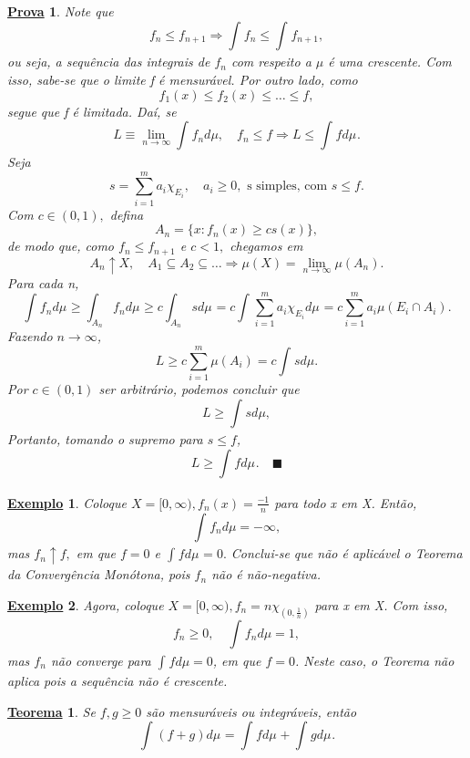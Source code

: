 \documentclass{article}
\newtheorem*{theorem*}{\underline{Teorema}}
\newtheorem{example}{\underline{Exemplo}}
\newtheorem*{proof*}{\underline{Prova}}
\renewcommand\qedsymbol{$\blacksquare$}
\begin{document}
  \begin{proof*}
   Note que 
     \[
       f_{n}\leq f_{n+1} \Rightarrow \int_{}^{}f_{n}\leq \int_{}^{}f_{n+1},
     \]
  ou seja, a sequência das integrais de \(f_{n}\) com respeito a \(\mu \) é uma crescente. Com isso, sabe-se que o limite f é mensurável. Por outro lado, como 
    \[
      f_1(x)\leq f_2(x)\leq \dotsc \leq f,
    \]
    segue que f é limitada. Daí, se 
      \[
        L\equiv \lim_{n\to \infty}\int_{}^{}f_{n}d\mu ,\quad f_{n}\leq f \Rightarrow L \leq \int_{}f d\mu_{}.
      \]
    Seja 
      \[
        s = \sum\limits_{i=1}^{m}a_{i}\chi_{E_{i}},\quad a_{i}\geq 0, \text{ s simples, com } s\leq f.
      \]
    Com \(c\in (0, 1),\) defina 
      \[
        A_{n} = \{x: f_{n}(x) \geq cs(x)\},
      \]
    de modo que, como \(f_{n}\leq f_{n+1}\) e \(c < 1,\) chegamos em 
      \[
        A_{n}\uparrow X,\quad A_1\subseteq A_2\subseteq \dotsc \Rightarrow \mu (X) = \lim_{n\to \infty}\mu (A_{n}).
      \]
    Para cada n, 
      \[
        \int_{}f_{n} d\mu_{} \geq \int_{A_{n}}f_{n} d\mu_{} \geq c \int_{A_{n}}s d\mu_{} = c \int_{}\sum\limits_{i=1}^{m}a_{i}\chi_{E_{i}} d\mu_{} = c \sum\limits_{i=1}^{m}a_{i}\mu (E_{i}\cap A_{i}).
      \]
    Fazendo \(n\to \infty\), 
      \[
        L \geq c \sum\limits_{i=1}^{m}\mu (A_{i}) = c \int_{}^{}s d\mu .
      \]
    Por \(c\in (0, 1)\) ser arbitrário, podemos concluir que 
      \[
        L \geq \int_{}^{}s d\mu, 
      \]
    Portanto, tomando o supremo para \(s \leq f\), 
      \[
        L \geq \int_{}f d\mu_{}.\quad \text{\qedsymbol}
      \]
 \end{proof*}
 \begin{example}
   Coloque \(X = [0, \infty), f_{n}(x) = \frac{-1}{n}\) para todo x em X. Então, 
     \[
       \int_{}^{}f_{n}d\mu = -\infty,
     \]
    mas \(f_{n}\uparrow f,\) em que \(f=0\) e \(\int_{}f d\mu_{} = 0.\) Conclui-se que não é aplicável o Teorema da Convergência Monótona, pois \(f_{n}\) não é não-negativa.
 \end{example}
 \begin{example}
   Agora, coloque \(X = [0, \infty), f_{n} = n \chi_{(0, \frac{1}{n})}\) para x em X. Com isso, 
     \[
       f_{n}\geq 0,\quad \int_{}^{}f_{n}d\mu = 1,
     \]
    mas \(f_{n}\) não converge para \(\int_{}^{}f d\mu = 0\), em que \(f=0\). Neste caso, o Teorema não aplica pois a sequência não é crescente.
 \end{example}
\begin{theorem*}
  Se \(f, g \geq 0\) são mensuráveis ou integráveis, então 
    \[
      \int_{}(f+g) d\mu_{} = \int_{}f d\mu_{} + \int_{}g d\mu_{}.
    \]
\end{theorem*}
\end{document}
